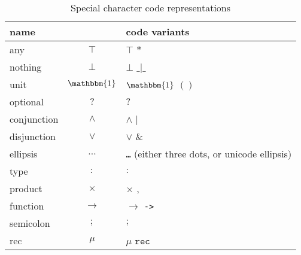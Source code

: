 \documentclass[10pt]{article}
\begin{document}
\begin{table}[ht]
\begin{center}
\begin{tabular}{lcl}
name & & code variants \\
\hline
any          & $\top$   & $\top$ $\mathtt{*}$ \\
nothing      & $\bot$   & $\bot$ $\mathtt{\_|\_}$ \\
unit         & $\mathbbm{1}$ & $\mathbbm{1}$ $\mathtt{()}$ \\
optional     & $?$      & $\mathtt{?}$ \\
conjunction  & $\land$  & $\land$ $\mathtt{|}$ \\
disjunction  & $\lor$   & $\lor$ $\mathtt{\&}$ \\
ellipsis     & $\ldots$ & \texttt{\ldots} (either three dots, or unicode ellipsis) \\
type         & $:$      & $\mathtt{:}$ \\
product      & $\times$ & $\times$ $\mathtt{,}$ \\
function     & $\to$    & $\to$ \texttt{->} \\
semicolon    & $;$      & $\mathtt{;}$ \\
rec          & $\mu$    & $\mu$ $\mathtt{rec}$
\end{tabular}
\end{center}
\caption{Special character code representations}
\end{table}
\end{document}
